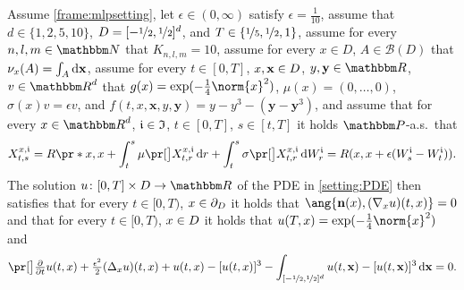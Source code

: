 \begin{example}
	Assume 
		\cref{frame:mlpsetting},
	let
		$\epsilon\in(0,\infty)$
	satisfy 
		$\epsilon = \tfrac{1}{10}$,
	assume that
		$d\in\{1,2,5,10\}$,
		$D = [-\nicefrac12, \nicefrac12]^d$, and
		$T\in\{\nicefrac{1}{5},\nicefrac{1}{2},1\}$,
	assume for every 
		$n,l,m\in \N$ 
	that
		$K_{n,l,m} = 10$,
	assume for every
		$x \in D$,
		$A \in \mathcal{B}(D)$
	that
		$\nu_x(A) = \int_A \mathrm{d}\mathbf{x}$,
	assume for every 
		$t \in [0,T]$,
		$x,\mathbf{x} \in D$,
		$y,\mathbf{y} \in \R$,
		$v \in \R^d$ 
	that
		$g(x)= \exp (- \tfrac{1}{4}\norm{x}^2)$,
		$\mu(x)=(0,\dots,0)$,
		$\sigma(x) v = \epsilon v$, and
		$f(t,x,{\mathbf x},y,{\mathbf y})= y - y^3 - (\mathbf{y} - {\mathbf y}^3)$,
	and	assume that 
		for every 
			$x\in \R^{d}$, 
			$\mathfrak{i} \in \mathfrak{I}$, 
			$t\in [0,T]$, 
			$s\in [t,T]$ 
		it holds $\P$-a.s.\ that
		\begin{equation}
			X^{x,\dindex}_{t,s} 
			= 
			R\pr*{x,x + \int_{t}^{s} \mu\bpr{X^{x,\dindex}_{t,r}} \, \diff r + \int^{s}_{t} \sigma \bpr{X^{x,\dindex}_{t,r}} \, \diff W^{\dindex}_{r} }
			=
			R(x,x+\epsilon(W^\dindex_s-W^\dindex_t))
			.
		\end{equation}
	The solution 
		$u\colon[0,T]\times \D \to \R$ 
	of the PDE in \eqref{setting:PDE} then satisfies that 
		for every
			$t\in [0,T)$, 
			$x\in\partial_D$
		it holds that
			$\ang{\mathbf{n}(x) ,(\nabla_x u)(t,x)} = 0$
		and that for every
			$t\in [0,T)$, $x\in D$
		it holds that
			$u(T,x) = \exp (- \tfrac{1}{4}\norm{x}^2)$ and			
		\begin{equation}
			\label{eqMLP:allen_cahn}
			\bpr{\tfrac{\partial}{\partial t}u}(t,x)
			+
			\tfrac{\epsilon^2}{2} (\Delta_x u)(t,x) 
			+ 
			u(t,x) - [u(t,x)]^3 
			- 
			\int_{[-\nicefrac12,\nicefrac12]^d} u(t,\mathbf{x}) - [u(t,\mathbf{x})]^3\, \diff \mathbf{x} 
			=
			0
			.
		\end{equation}
\end{example}


